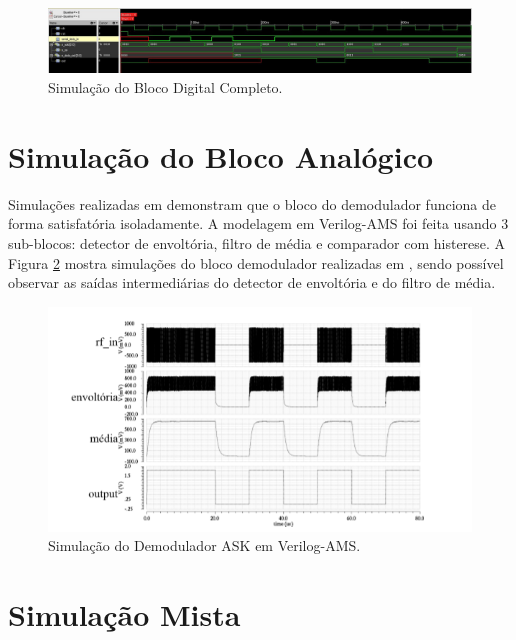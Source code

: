 \begin{figure}[ht!]
  \centering
  \includegraphics[width=\textwidth]{figuras/simbd.JPG}
  \caption{Simulação do Bloco Digital Completo.}
  \label{sbdc}
\end{figure}


\section{Simulação do Bloco Analógico}

Simulações realizadas em \cite{Marlon} demonstram que o bloco do demodulador funciona de forma satisfatória isoladamente. A modelagem em Verilog-AMS foi feita usando 3 sub-blocos: detector de envoltória, filtro de média e comparador com histerese. A Figura \ref{dem} mostra simulações do bloco demodulador realizadas em \cite{Marlon}, sendo possível observar as saídas intermediárias do detector de envoltória e do filtro de média.

\begin{figure}[ht!]
  \centering
  \includegraphics[width=\textwidth]{figuras/dem.PNG}
  \caption{Simulação do Demodulador ASK em Verilog-AMS\cite{Marlon}.}
  \label{dem}
\end{figure}

\section{Simulação Mista}